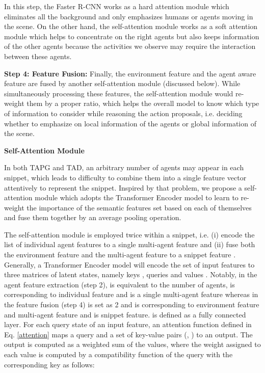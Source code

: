 \documentclass{ieeeaccess}
\begin{document}
In this step, the Faster R-CNN \cite{FasterRCNN} works as a hard attention module which eliminates all the background and only emphasizes humans or agents moving in the scene. On the other hand, the self-attention module works as a soft attention module which helps to concentrate on the right agents but also keeps information of the other agents because the activities we observe may require the interaction between these agents.

\textbf{Step 4: Feature Fusion:}
Finally, the environment feature  and the agent aware feature  are fused by another self-attention module (discussed below). While simultaneously processing these features, the self-attention module would re-weight them by a proper ratio, which helps the overall model to know which type of information to consider while reasoning the action proposals, i.e. deciding whether to emphasize on local information of the agents or global information of the scene.

\textbf{Self-Attention Module}
\label{subsec:trans_encoder}

In both TAPG and TAD, an arbitrary number of agents may appear in each snippet, which leads to difficulty to combine them into a single feature vector attentively to represent the snippet. Inspired by that problem, we propose a self-attention module which adopts the Transformer Encoder model \cite{attention_is_all_you_need} to learn to re-weight the importance of the semantic features set based on each of themselves and fuse them together by an average pooling operation.



The self-attention module is employed twice within a snippet, i.e. (i) encode the list of individual agent features to a single multi-agent feature and (ii) fuse both the environment feature  and the multi-agent feature  to a snippet feature . Generally, a Transformer Encoder model will encode the set of input features  to three matrices of latent states, namely keys , queries  and values . Notably, in the agent feature extraction (step 2),  is equivalent to the number of agents,  is corresponding to individual feature and  is a single multi-agent feature whereas in the feature fusion (step 4)  is set as 2 and  is corresponding to environment feature and multi-agent feature and  is snippet feature.  is defined as a fully connected layer. For each query state  of an input feature, an attention function defined in Eq. \ref{attention} maps a query   and a set of key-value pairs (, ) to an output. The output is computed as a weighted sum of the values, where the weight assigned to each value is computed by a compatibility function of the query with the corresponding key as follows:
\end{document}
